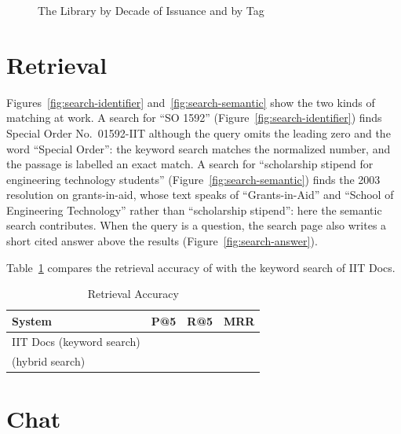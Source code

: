 \begin{figure}[htbp]
  \centering
  
  \caption{The Library by Decade of Issuance and by Tag}\label{fig:library-charts}
\end{figure}

\section{Retrieval}\label{sec:retrieval-results}

Figures~\ref{fig:search-identifier} and~\ref{fig:search-semantic} show the two kinds of matching at work. A search for ``SO 1592'' (Figure~\ref{fig:search-identifier}) finds Special Order No.~01592-IIT although the query omits the leading zero and the word ``Special Order'': the keyword search matches the normalized number, and the passage is labelled an exact match. A search for ``scholarship stipend for engineering technology students'' (Figure~\ref{fig:search-semantic}) finds the 2003 resolution on grants-in-aid, whose text speaks of ``Grants-in-Aid'' and ``School of Engineering Technology'' rather than ``scholarship stipend'': here the semantic search contributes. When the query is a question, the search page also writes a short cited answer above the results (Figure~\ref{fig:search-answer}).


Table~\ref{tab:retrieval} compares the retrieval accuracy of \cs{} with the keyword search of IIT Docs.

\begin{table}[htbp]
  \centering
  \caption{Retrieval Accuracy}\label{tab:retrieval}
  \begin{tabular}{@{}lccc@{}}
    \toprule
    \textbf{System} & \textbf{P@5} & \textbf{R@5} & \textbf{MRR} \\
    \midrule
    IIT Docs (keyword search) & \TODO{} & \TODO{} & \TODO{} \\
    \cs{} (hybrid search) & \TODO{} & \TODO{} & \TODO{} \\
    \bottomrule
  \end{tabular}
\end{table}

\section{Chat}\label{sec:chat-observations}

